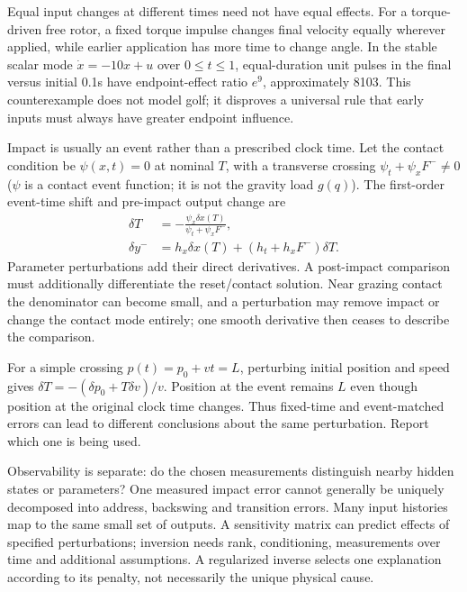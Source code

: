 Equal input changes at different times need not have equal effects. For a torque-driven free rotor, a fixed torque impulse changes final velocity equally wherever applied, while earlier application has more time to change angle. In the stable scalar mode $\dot x=-10x+u$ over $0\leq t\leq1$, equal-duration unit pulses in the final versus initial 0.1s have endpoint-effect ratio $e^9$, approximately 8103. This counterexample does not model golf; it disproves a universal rule that early inputs must always have greater endpoint influence.

Impact is usually an event rather than a prescribed clock time. Let the contact
condition be $\psi(x,t)=0$ at nominal $T$, with a transverse crossing
$\psi_t+\psi_x F^-\ne0$ ($\psi$ is a contact event function; it is not the
gravity load $g(q)$). The first-order event-time shift and pre-impact output
change are
\begin{equation}
\begin{aligned}
\delta T&=-\frac{\psi_x\delta x(T)}{\psi_t+\psi_x F^-},\\
\delta y^-&=h_x\delta x(T)+(h_t+h_xF^-)\delta T.
\end{aligned}
\label{eq:complete_event}
\end{equation}
Parameter perturbations add their direct derivatives. A post-impact comparison must additionally differentiate the reset/contact solution. Near grazing contact the denominator can become small, and a perturbation may remove impact or change the contact mode entirely; one smooth derivative then ceases to describe the comparison.

For a simple crossing $p(t)=p_0+vt=L$, perturbing initial position and speed gives $\delta T=-(\delta p_0+T\delta v)/v$. Position at the event remains $L$ even though position at the original clock time changes. Thus fixed-time and event-matched errors can lead to different conclusions about the same perturbation. Report which one is being used.

Observability is separate: do the chosen measurements distinguish nearby hidden states or parameters? One measured impact error cannot generally be uniquely decomposed into address, backswing and transition errors. Many input histories map to the same small set of outputs. A sensitivity matrix can predict effects of specified perturbations; inversion needs rank, conditioning, measurements over time and additional assumptions. A regularized inverse selects one explanation according to its penalty, not necessarily the unique physical cause.

